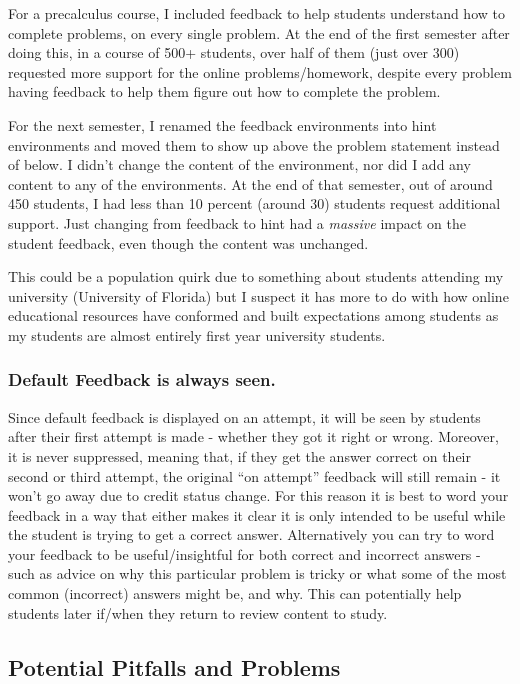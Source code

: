 \documentclass{ximera}
\begin{document}
            For a precalculus course, I included feedback to help students understand how to complete problems, on every single problem. At the end of the first semester after doing this, in a course of 500+ students, over half of them (just over 300) requested more support for the online problems/homework, despite every problem having feedback to help them figure out how to complete the problem. 
            
            For the next semester, I renamed the feedback environments into hint environments and moved them to show up above the problem statement instead of below. I didn't change the content of the environment, nor did I add any content to any of the environments. At the end of that semester, out of around 450 students, I had less than 10 percent (around 30) students request additional support. Just changing from feedback to hint had a \textit{massive} impact on the student feedback, even though the content was unchanged. 
            
            This could be a population quirk due to something about students attending my university (University of Florida) but I suspect it has more to do with how online educational resources have conformed and built expectations among students as my students are almost entirely first year university students.
            
        \subsubsection*{Default Feedback is always seen.}
            Since default feedback is displayed on an attempt, it will be seen by students after their first attempt is made - whether they got it right or wrong. Moreover, it is never suppressed, meaning that, if they get the answer correct on their second or third attempt, the original ``on attempt'' feedback will still remain - it won't go away due to credit status change. For this reason it is best to word your feedback in a way that either makes it clear it is only intended to be useful while the student is trying to get a correct answer. Alternatively you can try to word your feedback to be useful/insightful for both correct and incorrect answers - such as advice on why this particular problem is tricky or what some of the most common (incorrect) answers might be, and why. This can potentially help students later if/when they return to review content to study.
        
        
    \subsection*{Potential Pitfalls and Problems}   
        
\end{document}
